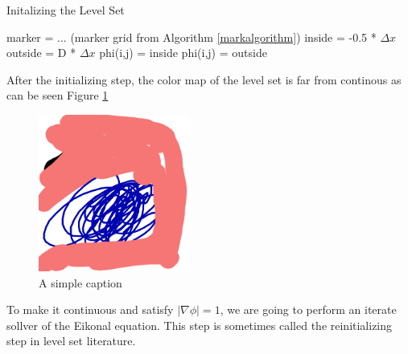 \begin{algorithm}
\caption{Initalizing the Level Set}
\begin{algorithmic}
\STATE marker = ... (marker grid from Algorithm \ref{markalgorithm})
\STATE inside = -0.5 * $\Delta x$
\STATE outside = D * $\Delta x$
\STATE phi(i,j) = inside
\ELSE
\STATE phi(i,j) = outside
\ENDIF
\ENDFOR
\ENDFOR
\end{algorithmic}
\label{particlestogridalgorithm2}
\end{algorithm}

After the initializing step, the color map of the level set is far from continous as can be seen Figure \ref{initpic}

\begin{figure}[ht!]
\centering
\includegraphics[width=50mm]{ch4/init.png}
\caption{A simple caption}
\label{initpic}
\end{figure}

To make it continuous and satisfy $|\nabla \phi| = 1$, we are going to perform an iterate sollver of the Eikonal equation. This step is sometimes called the reinitializing step in level set literature.

